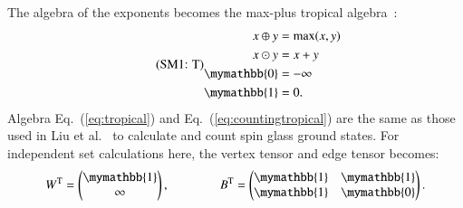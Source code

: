 \documentclass[onefignum, onetabnum]{siamart190516}
\newcommand{\eqname}[1]{\stepcounter{equation}\tag{\theequation : #1}}
\newcommand{\<}{\langle}
\renewcommand{\>}{\rangle}
\newcommand{\Eq}[1]{Eq.~(\ref{#1})}
\begin{document}
The algebra of the exponents becomes the max-plus tropical algebra~\cite{Maclagan2015, Moore2011}:
\begin{equation}\eqname{T}
    \begin{split}
        x \oplus y &= \max(x,y)\\
        x \odot y &= x + y\\
        \mymathbb{0} &= -\infty\\
        \mymathbb{1} &= 0.
    \end{split}\label{eq:tropical}
\end{equation}
Algebra \Eq{eq:tropical} and \Eq{eq:countingtropical} are the same as those used in Liu et al.~\cite{Liu2021} to calculate and count spin glass ground states.
For independent set calculations here, the vertex tensor and edge tensor becomes:
\begin{equation}
    W^{\rm T} = \left(\begin{matrix}
        \mymathbb{1} \\
        \infty
    \end{matrix}\right),   
    \qquad \qquad
        B^{\rm T} = \left(\begin{matrix}
        \mymathbb{1}  & \mymathbb{1} \\
        \mymathbb{1} & \mymathbb{0}
    \end{matrix}\right).
\end{equation}
\end{document}
